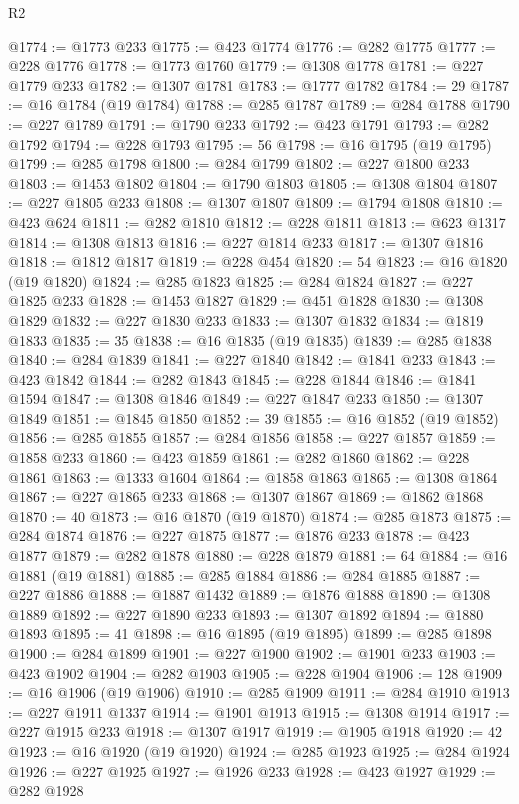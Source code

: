 \begin{lexlean}{R2}
\begin{coremodule}
@1774 := @1773 @233
@1775 := @423 @1774
@1776 := @282 @1775
@1777 := @228 @1776
@1778 := @1773 @1760
@1779 := @1308 @1778
@1781 := @227 @1779 @233
@1782 := @1307 @1781
@1783 := @1777 @1782
@1784 := 29
@1787 := @16 @1784 (@19 @1784)
@1788 := @285 @1787
@1789 := @284 @1788
@1790 := @227 @1789
@1791 := @1790 @233
@1792 := @423 @1791
@1793 := @282 @1792
@1794 := @228 @1793
@1795 := 56
@1798 := @16 @1795 (@19 @1795)
@1799 := @285 @1798
@1800 := @284 @1799
@1802 := @227 @1800 @233
@1803 := @1453 @1802
@1804 := @1790 @1803
@1805 := @1308 @1804
@1807 := @227 @1805 @233
@1808 := @1307 @1807
@1809 := @1794 @1808
@1810 := @423 @624
@1811 := @282 @1810
@1812 := @228 @1811
@1813 := @623 @1317
@1814 := @1308 @1813
@1816 := @227 @1814 @233
@1817 := @1307 @1816
@1818 := @1812 @1817
@1819 := @228 @454
@1820 := 54
@1823 := @16 @1820 (@19 @1820)
@1824 := @285 @1823
@1825 := @284 @1824
@1827 := @227 @1825 @233
@1828 := @1453 @1827
@1829 := @451 @1828
@1830 := @1308 @1829
@1832 := @227 @1830 @233
@1833 := @1307 @1832
@1834 := @1819 @1833
@1835 := 35
@1838 := @16 @1835 (@19 @1835)
@1839 := @285 @1838
@1840 := @284 @1839
@1841 := @227 @1840
@1842 := @1841 @233
@1843 := @423 @1842
@1844 := @282 @1843
@1845 := @228 @1844
@1846 := @1841 @1594
@1847 := @1308 @1846
@1849 := @227 @1847 @233
@1850 := @1307 @1849
@1851 := @1845 @1850
@1852 := 39
@1855 := @16 @1852 (@19 @1852)
@1856 := @285 @1855
@1857 := @284 @1856
@1858 := @227 @1857
@1859 := @1858 @233
@1860 := @423 @1859
@1861 := @282 @1860
@1862 := @228 @1861
@1863 := @1333 @1604
@1864 := @1858 @1863
@1865 := @1308 @1864
@1867 := @227 @1865 @233
@1868 := @1307 @1867
@1869 := @1862 @1868
@1870 := 40
@1873 := @16 @1870 (@19 @1870)
@1874 := @285 @1873
@1875 := @284 @1874
@1876 := @227 @1875
@1877 := @1876 @233
@1878 := @423 @1877
@1879 := @282 @1878
@1880 := @228 @1879
@1881 := 64
@1884 := @16 @1881 (@19 @1881)
@1885 := @285 @1884
@1886 := @284 @1885
@1887 := @227 @1886
@1888 := @1887 @1432
@1889 := @1876 @1888
@1890 := @1308 @1889
@1892 := @227 @1890 @233
@1893 := @1307 @1892
@1894 := @1880 @1893
@1895 := 41
@1898 := @16 @1895 (@19 @1895)
@1899 := @285 @1898
@1900 := @284 @1899
@1901 := @227 @1900
@1902 := @1901 @233
@1903 := @423 @1902
@1904 := @282 @1903
@1905 := @228 @1904
@1906 := 128
@1909 := @16 @1906 (@19 @1906)
@1910 := @285 @1909
@1911 := @284 @1910
@1913 := @227 @1911 @1337
@1914 := @1901 @1913
@1915 := @1308 @1914
@1917 := @227 @1915 @233
@1918 := @1307 @1917
@1919 := @1905 @1918
@1920 := 42
@1923 := @16 @1920 (@19 @1920)
@1924 := @285 @1923
@1925 := @284 @1924
@1926 := @227 @1925
@1927 := @1926 @233
@1928 := @423 @1927
@1929 := @282 @1928

\end{coremodule}
\end{lexlean}
